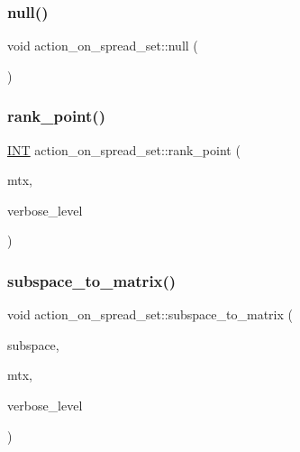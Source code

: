\subsubsection{\texorpdfstring{null()}{null()}}
{\footnotesize\ttfamily void action\+\_\+on\+\_\+spread\+\_\+set\+::null (\begin{DoxyParamCaption}{ }\end{DoxyParamCaption})}

\mbox{\label{classaction__on__spread__set_a1d7082bfaaf523ad746fe94685fe2e43}} 
\subsubsection{\texorpdfstring{rank\+\_\+point()}{rank\_point()}}
{\footnotesize\ttfamily \mbox{\hyperlink{galois_8h_a09fddde158a3a20bd2dcadb609de11dc}{I\+NT}} action\+\_\+on\+\_\+spread\+\_\+set\+::rank\+\_\+point (\begin{DoxyParamCaption}\item[{\mbox{\hyperlink{galois_8h_a09fddde158a3a20bd2dcadb609de11dc}{I\+NT}} $\ast$}]{mtx,  }\item[{\mbox{\hyperlink{galois_8h_a09fddde158a3a20bd2dcadb609de11dc}{I\+NT}}}]{verbose\+\_\+level }\end{DoxyParamCaption})}

\mbox{\label{classaction__on__spread__set_a0ebb18d5e01ccad6c67d75b5073e5326}} 
\subsubsection{\texorpdfstring{subspace\+\_\+to\+\_\+matrix()}{subspace\_to\_matrix()}}
{\footnotesize\ttfamily void action\+\_\+on\+\_\+spread\+\_\+set\+::subspace\+\_\+to\+\_\+matrix (\begin{DoxyParamCaption}\item[{\mbox{\hyperlink{galois_8h_a09fddde158a3a20bd2dcadb609de11dc}{I\+NT}} $\ast$}]{subspace,  }\item[{\mbox{\hyperlink{galois_8h_a09fddde158a3a20bd2dcadb609de11dc}{I\+NT}} $\ast$}]{mtx,  }\item[{\mbox{\hyperlink{galois_8h_a09fddde158a3a20bd2dcadb609de11dc}{I\+NT}}}]{verbose\+\_\+level }\end{DoxyParamCaption})}

